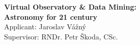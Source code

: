 












\vspace{2cm}
\begin{center}
\huge{\bf Virtual Observatory \& Data Mining:\\ Astronomy for 21 century}\\
\medskip
\large{Applicant: {Jaroslav Vážný}}\\
\large{Supervisor: RNDr. Petr Škoda, CSc.}
\end{center}
\noindent\hrulefill


